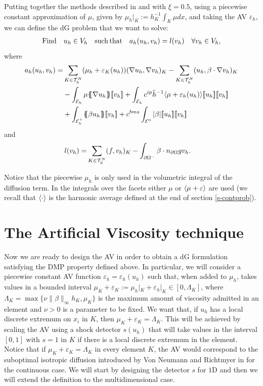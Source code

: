  
Putting together the methods described in  and  with $\xi=0.5$, using a piecewise constant approximation of $\mu$, given by $\mu_h|_K := h^{-1}_K \int_K \mu dx$, and taking the AV $\varepsilon_h$, we can define the dG problem that we want to solve: 
\begin{align}\label{eq-dscrtpbm}
{\rm Find}\quad u_h\in V_h \quad {\rm such}\,{\rm that }\quad a_h(u_h,v_h) = l(v_h) \quad \forall v_h\in V_h,
\end{align}
where
\begin{align}\label{eq-bform}
a_h(u_h,v_h) = & \displaystyle\sum\limits_{K\in \thn} (\mu_h + \varepsilon_K(u_h)) ( \nabla u_h, \nabla v_{h})_K - 
\displaystyle\sum\limits_{K\in \thn} ( u_h,  \beta \cdot \nabla v_{h})_K \\
 & - \int_{\mathcal{E}_h} \mu \mean{\nabla u_h} \jump{v_h}   +  \int_{ \mathcal{E}_h} c^{ip} \tilde{h}^{-1} \meanhar{\mu+\varepsilon_h(u_h)}\jump{  u_{h}}\jump{  v_{h}}  \nonumber \\
 &+ \int_{\mathcal{E}_h^+}   \mean{\beta u_h}\jump{v_h} + c^{bms} \int_{ \mathcal{E}^0}  |\beta|  \jump{u_h} \jump{v_h} \nonumber
\end{align}
and 
\begin{align*}
l(v_h) = & \displaystyle\sum\limits_{K\in \mathcal{T}_h^N} (f,v_h)_K - \int_{\partial \Omega^-} \beta \cdot n_{\partial\Omega}g v_h.
\end{align*}

{Notice that the piecewise $\mu_h$ is only used in the volumetric integral of the diffusion term. In the integrals over the facets either $\mu$ or $\langle\mu+\varepsilon\rangle$ are used} { (we recall that $\langle\cdot\rangle$ is the harmonic average defined at the end of section \ref{s-contprob})}.
\section{The Artificial Viscosity technique}\label{s-ad}

Now we are ready to design the AV in order to obtain a dG formulation satisfying the DMP property defined above. In particular, we will consider a piecewise constant AV function $\varepsilon_h=\varepsilon_h(u_h)$ such that, when added to $\mu_h$, takes values in a bounded interval $\mu_K + \varepsilon_K := \mu_h|_K + \varepsilon_h|_K\in [0,\Lambda_K]$, where $\Lambda_K=\max\{\nu \|\beta\|_\infty h_{K},\mu_K\}$ is the maximum amount of viscosity admitted in an element and $\nu>0$ is a parameter to be fixed. We want that, if $u_h$ has a local discrete extremum on $x_i$ in $K$, then  $\mu_{K}+ \varepsilon_{K} = \Lambda_{K}$. This will be achieved by scaling the AV using a shock detector $s(u_h)$ that will take values in the interval $[0,1]$ with $s=1$ in $K$ if there is a local discrete extremum in the element. { Notice that if $\mu_K+\varepsilon_K = \Lambda_K$ in every element $K$, the AV would correspond to the suboptimal isotropic diffusion introduced by Von Neumann and Richtmyer in \cite{vonneumann1950method} for the continuous case}. We will start by designing the detector $s$ for $1$D and then we will extend the definition to the multidimensional case.

